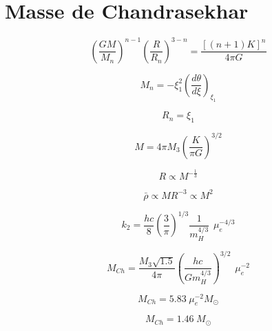 \section{Masse de Chandrasekhar}

\begin{equation}\left( \dfrac{GM}{M_{n}}\right)^{n-1} \left( \dfrac{R}{R_{n}}\right)^{3-n}=\dfrac{\left[ \left( n+1\right)K\right]^n}{4\pi G}\end{equation}

\begin{equation}M_{n}=-\xi_{1}^{2}\left( \dfrac{d\theta}{d\xi}\right)_{\xi_{1}}\end{equation}

\begin{equation}R_{n}=\xi_{1}\end{equation}

\begin{equation}M=4\pi M_{3}\left(\dfrac{K}{\pi G}\right)^{3/2}\end{equation}

\begin{equation}R\propto M^{-\frac{1}{3}}\end{equation}

\begin{equation}\bar{\rho}\propto M R^{-3}\propto M^{2}\end{equation}

\begin{equation}k_{2}=\dfrac{hc}{8}\left(\dfrac{3}{\pi}\right)^{1/3} \dfrac{1}{m_{H}^{4/3}}\hspace{5pt}\mu_e^{-4/3}\end{equation}

\begin{equation}M_{Ch}=\dfrac{M_{3}\sqrt{1.5}}{4\pi}\left( \dfrac{hc}{Gm_{H}^{4/3}}\right)^{3/2}\hspace{5pt}\mu_{e}^{-2}\end{equation}

\begin{equation}M_{Ch}=5.83\hspace{3pt}\mu_{e}^{-2}M_\odot\end{equation}

\begin{equation}M_{Ch}=1.46\hspace{3pt}M_\odot\end{equation}